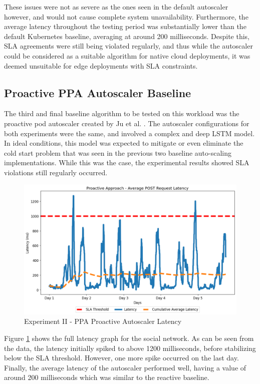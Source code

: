 These issues were not as severe as the ones seen in the default autoscaler however, and would not cause complete system unavailability. Furthermore, the average latency throughout the testing period was substantially lower than the default Kubernetes baseline, averaging at around 200 milliseconds. Despite this, SLA agreements were still being violated regularly, and thus while the autoscaler could be considered as a suitable algorithm for native cloud deployments, it was deemed unsuitable for edge deployments with SLA constraints.\par

\subsection {Proactive PPA Autoscaler Baseline}
\label{subsec:ch5-exp2-proactive-algo}

The third and final baseline algorithm to be tested on this workload was the proactive pod autoscaler created by Ju et al. \cite{ju2021proactive}. The autoscaler configurations for both experiments were the same, and involved a complex and deep LSTM model. In ideal conditions, this model was expected to mitigate or even eliminate the cold start problem that was seen in the previous two baseline auto-scaling implementations. While this was the case, the experimental results showed SLA violations still regularly occurred.\par

\begin{figure}[htb]
    \centering
    \caption{Experiment II - PPA Proactive Autoscaler Latency}
    \label{fig:exp2-proactive-k8s}
    \includegraphics[width=0.6\linewidth]{Figures/Compose-Post-Proactive-Latency.png}
\end{figure}

Figure \ref{fig:exp2-proactive-k8s} shows the full latency graph for the social network. As can be seen from the data, the latency initially spiked to above 1200 milliseconds, before stabilizing below the SLA threshold. However, one more spike occurred on the last day. Finally, the average latency of the autoscaler performed well, having a value of around 200 milliseconds which was similar to the reactive baseline.\par

